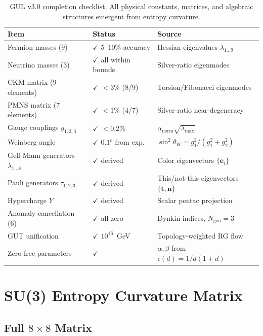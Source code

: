 \documentclass[11pt]{article}
\begin{document}
\begin{table}[htbp]
\centering
\caption{GUL v3.0 completion checklist. All physical constants,
matrices, and algebraic structures emergent from entropy curvature.}
\label{tab:summary}
\begin{tabular}{@{}lll@{}}
\toprule
Item & Status & Source \\
\midrule
Fermion masses (9) & $\checkmark$ $5$--$10\%$ accuracy
  & Hessian eigenvalues $\lambda_{1\ldots9}$ \\
Neutrino masses (3) & $\checkmark$ all within bounds
  & Silver-ratio eigenmodes \\
CKM matrix (9 elements) & $\checkmark$ $<3\%$ (8/9)
  & Torsion/Fibonacci eigenmodes \\
PMNS matrix (7 elements) & $\checkmark$ $<1\%$ (4/7)
  & Silver-ratio near-degeneracy \\
Gauge couplings $g_{1,2,3}$ & $\checkmark$ $<0.2\%$
  & $\alpha_\text{norm}\sqrt{\lambda_\text{max}}$ \\
Weinberg angle & $\checkmark$ $0.1°$ from exp.\
  & $\sin^2\theta_W=g_1^2/(g_1^2+g_2^2)$ \\
Gell-Mann generators $\lambda_{1\ldots8}$ & $\checkmark$ derived
  & Color eigenvectors $\{\mathbf{e}_i\}$ \\
Pauli generators $\tau_{1,2,3}$ & $\checkmark$ derived
  & This/not-this eigenvectors $\{\mathbf{t},\mathbf{n}\}$ \\
Hypercharge $Y$ & $\checkmark$ derived
  & Scalar pentac projection \\
Anomaly cancellation (6) & $\checkmark$ all zero
  & Dynkin indices, $N_\text{gen}=3$ \\
GUT unification & $\checkmark$ $10^{16}$~GeV
  & Topology-weighted RG flow \\
Zero free parameters & $\checkmark$
  & $\alpha,\beta$ from $\epsilon(d)=1/d(1+d)$ \\
\bottomrule
\end{tabular}
\end{table}

\appendix

\section{SU(3) Entropy Curvature Matrix}
\label{app:su3}

\subsection{Full $8\times8$ Matrix}
\end{document}
